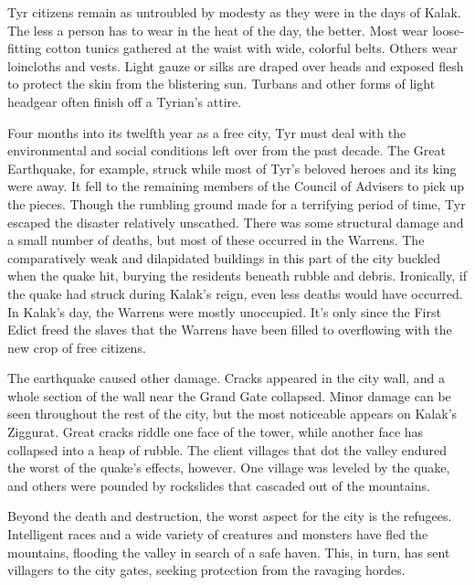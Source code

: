 {	Tyr citizens remain as untroubled by modesty as they were in the days of Kalak. The less a person has to wear in the heat of the day, the better. Most wear loose‐fitting cotton tunics gathered at the waist with wide, colorful belts. Others wear loincloths and vests. Light gauze or silks are draped over heads and exposed flesh to protect the skin from the blistering sun. Turbans and other forms of light headgear often finish off a Tyrian's attire.
}
{
	Four months into its twelfth year as a free city, Tyr must deal with the environmental and social conditions left over from the past decade. The Great Earthquake, for example, struck while most of Tyr's beloved heroes and its king were away. It fell to the remaining members of the Council of Advisers to pick up the pieces. Though the rumbling ground made for a terrifying period of time, Tyr escaped the disaster relatively unscathed. There was some structural damage and a small number of deaths, but most of these occurred in the Warrens. The comparatively weak and dilapidated buildings in this part of the city buckled when the quake hit, burying the residents beneath rubble and debris. Ironically, if the quake had struck during Kalak's reign, even less deaths would have occurred. In Kalak's day, the Warrens were mostly unoccupied. It's only since the First Edict freed the slaves that the Warrens have been filled to overflowing with the new crop of free citizens.

	The earthquake caused other damage. Cracks appeared in the city wall, and a whole section of the wall near the Grand Gate collapsed. Minor damage can be seen throughout the rest of the city, but the most noticeable appears on Kalak's Ziggurat. Great cracks riddle one face of the tower, while another face has collapsed into a heap of rubble. The client villages that dot the valley endured the worst of the quake's effects, however. One village was leveled by the quake, and others were pounded by rockslides that cascaded out of the mountains.

	Beyond the death and destruction, the worst aspect for the city is the refugees. Intelligent races and a wide variety of creatures and monsters have fled the mountains, flooding the valley in search of a safe haven. This, in turn, has sent villagers to the city gates, seeking protection from the ravaging hordes.

}
